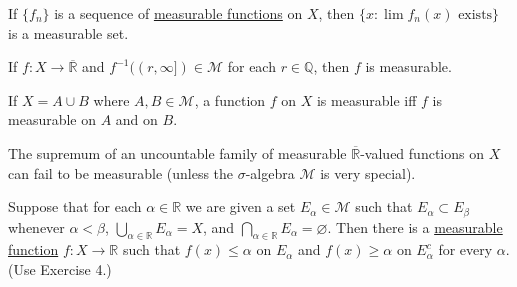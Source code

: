 	\begin{exercise}[Folland 2.3]
		If $\{f_n\}$ is a sequence of \hyperref[def:measurable-function]{measurable functions} on $X$, then $\{x : \lim f_n(x) \text{ exists}\}$ is a measurable set.
	\end{exercise}
	\begin{solution}

	\end{solution}

	\begin{exercise}[Folland 2.4]
		If $f : X \to \overline{\mathbb{R}}$ and $f^{-1}((r, \infty]) \in \mathcal{M}$ for each $r \in \mathbb{Q}$, then $f$ is measurable.
	\end{exercise}
	\begin{solution}

	\end{solution}

	\begin{exercise}[Folland 2.5]
		If $X = A \cup B$ where $A, B \in \mathcal{M}$, a function $f$ on $X$ is measurable iff $f$ is measurable on $A$ and on $B$.
	\end{exercise}
	\begin{solution}

	\end{solution}

	\begin{exercise}[Folland 2.6]
		The supremum of an uncountable family of measurable $\overline{\mathbb{R}}$-valued functions on $X$ can fail to be measurable (unless the $\sigma$-algebra $\mathcal{M}$ is very special).
	\end{exercise}
	\begin{solution}

	\end{solution}

	\begin{exercise}[Folland 2.7]
		Suppose that for each $\alpha \in \mathbb{R}$ we are given a set $E_\alpha \in \mathcal{M}$ such that $E_\alpha \subset E_\beta$ whenever $\alpha < \beta$, $\bigcup_{\alpha \in \mathbb{R}} E_\alpha = X$, and $\bigcap_{\alpha \in \mathbb{R}} E_\alpha = \varnothing$. Then there is a \hyperref[def:measurable-function]{measurable function} $f : X \to \mathbb{R}$ such that $f(x) \le \alpha$ on $E_\alpha$ and $f(x) \ge \alpha$ on $E_\alpha^c$ for every $\alpha$. (Use Exercise 4.)
	\end{exercise}
	\begin{solution}

	\end{solution}

